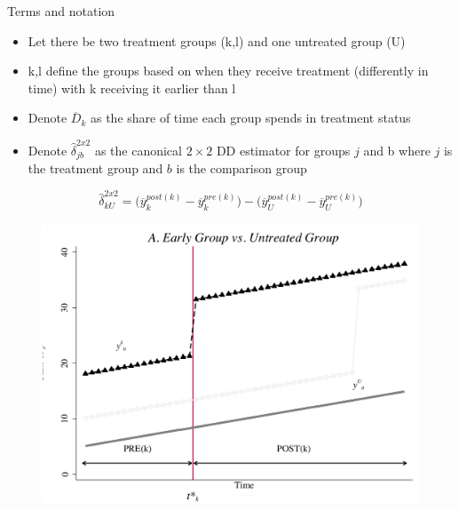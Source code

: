 \documentclass{beamer}
\begin{document}
\begin{frame}{Terms and notation}

\begin{itemize}
\item Let there be two treatment groups (k,l) and one untreated group (U)
\item k,l define the groups based on when they receive treatment (differently in time) with k receiving it earlier than l
\item Denote $\overline{D}_k$ as the share of time each group spends in treatment status
\item Denote $\widehat{\delta}_{jb}^{2x2}$ as the canonical $2\times 2$ DD estimator for groups $j$ and b where $j$ is the treatment group and $b$ is the comparison group
\end{itemize}

\end{frame}





\begin{frame}[plain]
$$\widehat{\delta}^{2x2}_{kU} = \bigg ( \overline{y}_k^{post(k)} - \overline{y}_k^{pre(k)} \bigg ) - \bigg ( \overline{y}_U^{post(k)} - \overline{y}_U^{pre(k)} \bigg ) $$
	\begin{figure}
	\includegraphics[scale=0.5]{./lecture_includes/bacon_goodman_3.png}
	\end{figure}

\end{frame}
\end{document}
